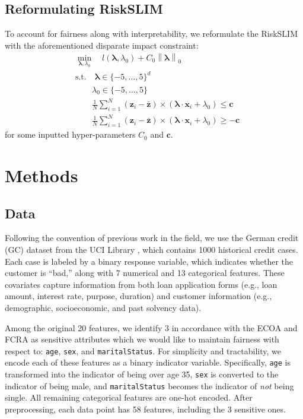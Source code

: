 \documentclass[11pt, margin=1in]{article}
\newcommand{\vect}[1]{\boldsymbol{#1}}
\newcommand{\norm}[1]{\left\lVert#1\right\rVert}
\begin{document}
\subsection{Reformulating RiskSLIM}

To account for fairness along with interpretability, we reformulate the RiskSLIM with the aforementioned disparate impact constraint:   
\begin{align*}
&\min_{\vect{\lambda}, \lambda_0} \quad l(\vect{\lambda}, \lambda_0) + C_0 \norm{\vect{\lambda}}_0 \\
&\text{s.t.} \quad \vect{\lambda} \in \{-5, \ldots, 5\}^d \\
&\quad \quad \lambda_0 \in \{-5, \ldots, 5\} \\
& \quad \quad \frac{1}{N}\sum_{i=1}^N (\vect{z}_i - \vect{\bar{z}}) \times (\vect{\lambda} \cdot \vect{x}_i + \lambda_0) \leq \vect{c} \\
& \quad \quad \frac{1}{N}\sum_{i=1}^N (\vect{z}_i - \vect{\bar{z}}) \times (\vect{\lambda} \cdot \vect{x}_i + \lambda_0) \geq -\vect{c}
\end{align*}
for some inputted hyper-parameters $C_0$ and $\vect{c}$.           


\section{Methods} \label{sec:methods}

\subsection{Data} \label{ssec:data}

Following the convention of previous work in the field, we use the German credit (GC) dataset from the UCI Library \cite{data}, which contains 1000 historical credit cases. Each case is labeled by a binary response variable, which indicates whether the customer is ``bad,'' along with 7 numerical and 13 categorical features. These covariates capture information from both loan application forms (e.g., loan amount, interest rate, purpose, duration) and customer information (e.g., demographic, socioeconomic, and past solvency data). 

Among the original 20 features, we identify 3 in accordance with the ECOA and FCRA as sensitive attributes which we would like to maintain fairness with respect to: \texttt{age}, \texttt{sex}, and \texttt{maritalStatus}. For simplicity and tractability, we encode each of these features as a binary indicator variable. Specifically, \texttt{age} is transformed into the indicator of being over age 35, \texttt{sex} is converted to the indicator of being male, and  \texttt{maritalStatus} becomes the indicator of \textit{not} being single. All remaining categorical features are one-hot encoded. After preprocessing, each data point has 58 features, including the 3 sensitive ones. 
\end{document}
